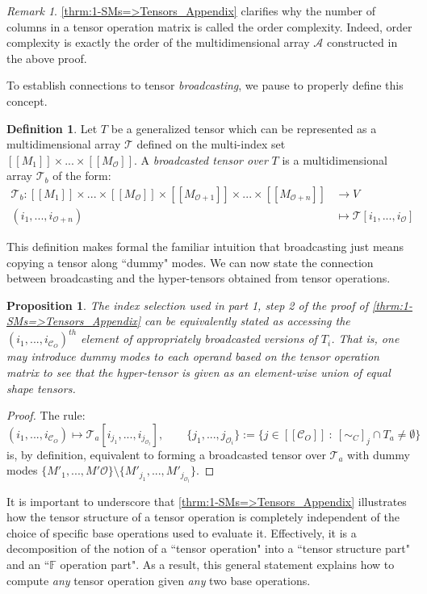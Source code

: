 \documentclass{article}
\theoremstyle{plain}
\newtheorem{proposition}[theorem]{Proposition}
\theoremstyle{definition}
\newtheorem{definition}[theorem]{Definition}
\theoremstyle{remark}
\newtheorem{remark}[theorem]{Remark}
\newcommand{\cC}{\mathcal{C}}
\newcommand{\cO}{\mathcal{O}}
\newcommand{\cA}{\mathcal{A}}
\newcommand{\cT}{\mathcal{T}}
\begin{document}
\begin{remark}
	\cref{thrm:1-SMs=>Tensors_Appendix} clarifies why the number of columns in a tensor operation matrix is called the order complexity. Indeed, order complexity is exactly the order of the multidimensional array $\cA$ constructed in the above proof.
\end{remark}
To establish connections to tensor \textit{broadcasting}, we pause to properly define this concept.
\begin{definition}
	Let $T$ be a generalized tensor which can be represented as a multidimensional array $\cT$ defined on the multi-index set $[[M_1]] \times ... \times [[M_{\cO}]]$. A \textit{broadcasted tensor over} $T$ is a multidimensional array $\cT_b$ of the form:
	\begin{equation*}
		\begin{aligned}
			\cT_b: [[M_1]] \times ... \times [[M_{\cO}]] \times [[M_{\cO + 1}]] \times ... \times [[M_{\cO + n}]] &\rightarrow V\\
			(i_1, ..., i_{\cO + n}) & \mapsto \cT[i_1, ..., i_{\cO}]
		\end{aligned}
	\end{equation*}
\end{definition}
This definition makes formal the familiar intuition that broadcasting just means copying a tensor along ``dummy" modes. We can now state the connection between broadcasting and the hyper-tensors obtained from tensor operations.
\begin{proposition}
	The index selection used in part 1, step 2 of the proof of \cref{thrm:1-SMs=>Tensors_Appendix} can be equivalently stated as accessing the $(i_1, ..., i_{\cC_O})^{th}$ element of appropriately broadcasted versions of $T_i$. That is, one may introduce dummy modes to each operand based on the tensor operation matrix to see that the hyper-tensor is given as an element-wise union of equal shape tensors.
\end{proposition}
\begin{proof}
	The rule:
	\begin{equation*}
		(i_1, ..., i_{\cC_O}) \mapsto \cT_a[i_{j_1}, ..., i_{j_{\cO_l}}], \qquad \{j_1, ..., j_{\cO_i}\} := \big\{j \in [[\cC_O]] \ : \ [\sim_C]_j \cap T_a \neq \emptyset \big\}
	\end{equation*}
	is, by definition, equivalent to forming a broadcasted tensor over $\cT_a$ with dummy modes $\{M'_1, ..., M'{\cO}\} \setminus \{M'_{j_1}, ..., M'_{j_{\cO_l}}\}$.
\end{proof}
It is important to underscore that \cref{thrm:1-SMs=>Tensors_Appendix} illustrates how the tensor structure of a tensor operation is completely independent of the choice of specific base operations used to evaluate it. Effectively, it is a decomposition of the notion of a ``tensor operation" into a ``tensor structure part" and an ``$\mathbb{F}$ operation part". As a result, this general statement explains how to compute \textit{any} tensor operation given \textit{any} two base operations.
\end{document}

